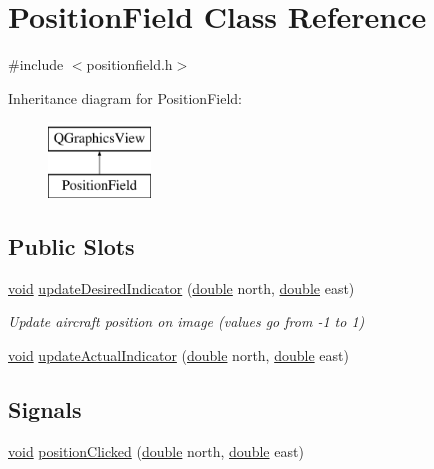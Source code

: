 \hypertarget{class_position_field}{\section{Position\-Field Class Reference}
\label{class_position_field}
}


{\ttfamily \#include $<$positionfield.\-h$>$}

Inheritance diagram for Position\-Field\-:\begin{figure}[H]
\begin{center}
\leavevmode
\includegraphics[height=2.000000cm]{class_position_field}
\end{center}
\end{figure}
\subsection*{Public Slots}
\begin{DoxyCompactItemize}
\item 
\hyperlink{group___u_a_v_objects_plugin_ga444cf2ff3f0ecbe028adce838d373f5c}{void} \hyperlink{group___g_c_s_control_gadget_plugin_gaf3402b55a7601e5b8b3346b40b0f0df7}{update\-Desired\-Indicator} (\hyperlink{_super_l_u_support_8h_a8956b2b9f49bf918deed98379d159ca7}{double} north, \hyperlink{_super_l_u_support_8h_a8956b2b9f49bf918deed98379d159ca7}{double} east)
\begin{DoxyCompactList}\small\item\em Update aircraft position on image (values go from -\/1 to 1) \end{DoxyCompactList}\item 
\hyperlink{group___u_a_v_objects_plugin_ga444cf2ff3f0ecbe028adce838d373f5c}{void} \hyperlink{group___g_c_s_control_gadget_plugin_ga1945f29d366d975855609e7a8e8a1338}{update\-Actual\-Indicator} (\hyperlink{_super_l_u_support_8h_a8956b2b9f49bf918deed98379d159ca7}{double} north, \hyperlink{_super_l_u_support_8h_a8956b2b9f49bf918deed98379d159ca7}{double} east)
\end{DoxyCompactItemize}
\subsection*{Signals}
\begin{DoxyCompactItemize}
\item 
\hyperlink{group___u_a_v_objects_plugin_ga444cf2ff3f0ecbe028adce838d373f5c}{void} \hyperlink{class_position_field_acadd3cdfe6db5418792382503b60e198}{position\-Clicked} (\hyperlink{_super_l_u_support_8h_a8956b2b9f49bf918deed98379d159ca7}{double} north, \hyperlink{_super_l_u_support_8h_a8956b2b9f49bf918deed98379d159ca7}{double} east)
\end{DoxyCompactItemize}
